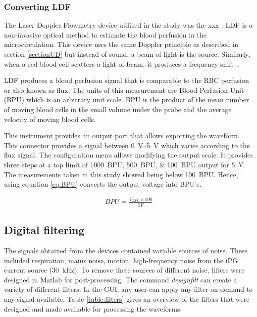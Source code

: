 \subsubsection{Converting LDF}
\label{section:ldf}
The Laser Doppler Flowmetry device utilised in the study was the xxx
. LDF is a non-invasive optical method to estimate the blood perfusion in the microcirculation. This device uses the same Doppler principle as described in section \ref{sectionUD} but instead of sound, a beam of light is the source. Similarly, when a red blood cell scatters a light of beam, it produces a frequency shift~\cite{fredriksson2007laser}. 

LDF produces a blood perfusion signal that is comparable to the RBC perfusion or also known as flux. The units of this measurement are Blood Perfusion Unit (BPU) which is an arbitrary unit scale. BPU is the product of the mean number of moving blood cells in the small volume under the probe and the average velocity of moving blood cells. 

This instrument provides an output port that allows exporting the waveform. This connector provides a signal between \SIrange{0}{5}{\volt} which varies according to the flux signal. The configuration menu allows modifying the output scale. It provides three steps at a top limit of \SIlist{1000;500;100}{BPU} output for \SI{5}{\volt}. The measurements taken in this study showed being below \SI{100}{BPU}. Hence, using equation \ref{eq:BPU} converts the output voltage into BPU's.

\begin{align}
	\label{eq:BPU}
	BPU = \frac{V_{BPU} \times 100}{5 V}
\end{align}


\subsection{Digital filtering}
\label{section4.2.2}

The signals obtained from the devices contained variable sources of noise. These included respiration, mains noise, motion, high-frequency noise from the iPG current source (\SI{30}{\kilo\hertz}). To remove these sources of different noise, filters were designed in Matlab for post-processing. The command \textit{designfilt} can create a variety of different filters. In the GUI, any user can apply any filter on demand to any signal available. Table \ref{table:filters} gives an overview of the filters that were designed and made available for processing the waveforms. 

